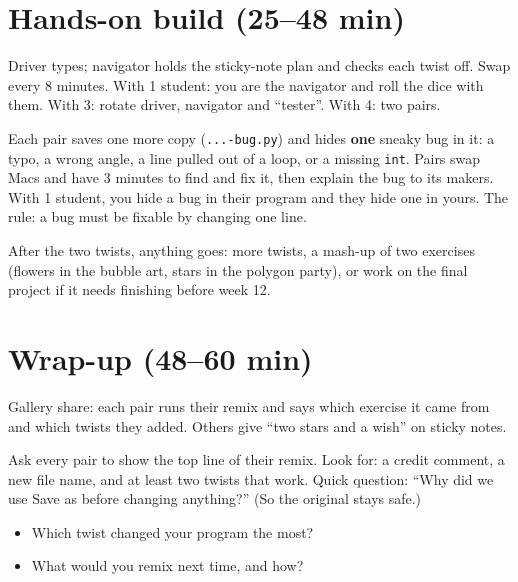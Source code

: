\section{Hands-on build (25--48 min)}
\begin{pairroles}
Driver types; navigator holds the sticky-note plan and checks each twist off. Swap every 8 minutes. With 1 student: you are the navigator and roll the dice with them. With 3: rotate driver, navigator and \enquote{tester}. With 4: two pairs.
\end{pairroles}
\begin{bughunt}
Each pair saves one more copy (\texttt{...-bug.py}) and hides \textbf{one} sneaky bug in it: a typo, a wrong angle, a line pulled out of a loop, or a missing \texttt{int}. Pairs swap Macs and have 3 minutes to find and fix it, then explain the bug to its makers. With 1 student, you hide a bug in their program and they hide one in yours. The rule: a bug must be fixable by changing one line.
\end{bughunt}
\begin{freebuild}
After the two twists, anything goes: more twists, a mash-up of two exercises (flowers in the bubble art, stars in the polygon party), or work on the final project if it needs finishing before week 12.
\end{freebuild}

\section{Wrap-up (48--60 min)}
Gallery share: each pair runs their remix and says which exercise it came from and which twists they added. Others give \enquote{two stars and a wish} on sticky notes.
\begin{formativecheck}
Ask every pair to show the top line of their remix. Look for: a credit comment, a new file name, and at least two twists that work. Quick question: \enquote{Why did we use Save as before changing anything?} (So the original stays safe.)
\end{formativecheck}
\begin{reflection}
\begin{itemize}[leftmargin=1.2em,itemsep=1pt]
  \item Which twist changed your program the most?
  \item What would you remix next time, and how?
\end{itemize}
\end{reflection}

